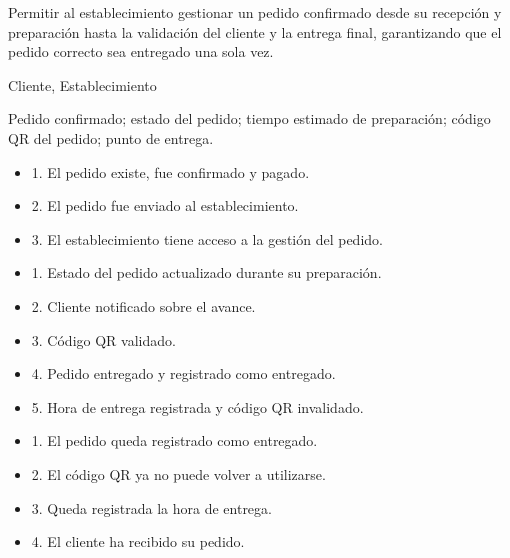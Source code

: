 \begin{description}[leftmargin=!, labelwidth=3.4cm, style=nextline, topsep=3pt]
\item[Objetivo] Permitir al establecimiento gestionar un pedido confirmado desde su recepción y preparación hasta la validación del cliente y la entrega final, garantizando que el pedido correcto sea entregado una sola vez.

\item[Actores] Cliente, Establecimiento


\item[Entradas] Pedido confirmado; estado del pedido; tiempo estimado de preparación; código QR del pedido; punto de entrega.

\item[Pre-condiciones] \hfill
\begin{itemize}[leftmargin=1.2em, topsep=1pt]
  \item 1. El pedido existe, fue confirmado y pagado.
  \item 2. El pedido fue enviado al establecimiento.
  \item 3. El establecimiento tiene acceso a la gestión del pedido.
\end{itemize}

\item[Salidas] \hfill
\begin{itemize}[leftmargin=1.2em, topsep=1pt]
  \item 1. Estado del pedido actualizado durante su preparación.
  \item 2. Cliente notificado sobre el avance.
  \item 3. Código QR validado.
  \item 4. Pedido entregado y registrado como entregado.
  \item 5. Hora de entrega registrada y código QR invalidado.
\end{itemize}

\item[Post-condiciones] \hfill
\begin{itemize}[leftmargin=1.2em, topsep=1pt]
  \item 1. El pedido queda registrado como entregado.
  \item 2. El código QR ya no puede volver a utilizarse.
  \item 3. Queda registrada la hora de entrega.
  \item 4. El cliente ha recibido su pedido.
\end{itemize}

\end{description}

